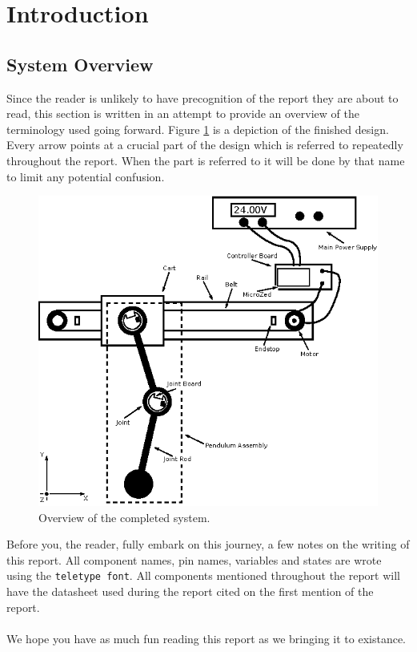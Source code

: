\section{Introduction}
\lipsum[5]
\subsection{System Overview} %
\label{sub:system_overview}
Since the reader is unlikely to have precognition of the report they are about to read, this section is written in an attempt to provide an overview of the terminology used going forward.
Figure \ref{fig:systemoverview} is a depiction of the finished design.
Every arrow points at a crucial part of the design which is referred to repeatedly throughout the report.
When the part is referred to it will be done by that name to limit any potential confusion.
\begin{figure}[h]
	\centering
	\includegraphics[width=\linewidth]{graphics/system_overview}
	\caption{Overview of the completed system.}
	\label{fig:systemoverview}
\end{figure}

Before you, the reader, fully embark on this journey, a few notes on the writing of this report. 
All component names, pin names, variables and states are wrote using the \texttt{teletype font}.
All components mentioned throughout the report will have the datasheet used during the report cited on the first mention of the report.
\\~\\
We hope you have as much fun reading this report as we bringing it to existance.

